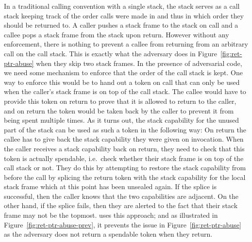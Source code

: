 \documentclass[acmsmall,screen]{acmart}\settopmatter{}
\begin{document}
In a traditional calling convention with a single stack, the stack serves as a call stack keeping track of the order calls were made in and thus in which order they should be returned to.
A caller pushes a stack frame to the stack on call and a callee pops a stack frame from the stack upon return.
However without any enforcement, there is nothing to prevent a callee from returning from an arbitrary call on the call stack.
This is exactly what the adversary does in Figure~\ref{fig:ret-ptr-abuse} when they skip two stack frames.
In the presence of adversarial code, we need some mechanism to enforce that the order of the call stack is kept.
One way to enforce this would be to hand out a token on call that can only be used when the caller's stack frame is on top of the call stack.
The callee would have to provide this token on return to prove that it is allowed to return to the caller, and on return the token would be taken back by the caller to prevent it from being spent multiple times.
As it turns out, the stack capability for the unused part of the stack can be used as such a token in the following way:
On return the callee has to give back the stack capability they were given on invocation.
When the caller receives a stack capability back on return, they need to check that this token is actually spendable, i.e.\ check whether their stack frame is on top of the call stack or not.
They do this by attempting to restore the stack capability from before the call by splicing the return token with the stack capability for the local stack frame which at this point has been unsealed again.
If the splice is successful, then the caller knows that the two capabilities are adjacent. On the other hand, if the splice fails, then they are alerted to the fact that their stack frame may not be the topmost.
\stktokens{} uses this approach; and as illustrated in Figure~\ref{fig:ret-ptr-abuse-prev}, it prevents the issue in Figure~\ref{fig:ret-ptr-abuse} as the adversary does not return a spendable token when they return.
\end{document}
